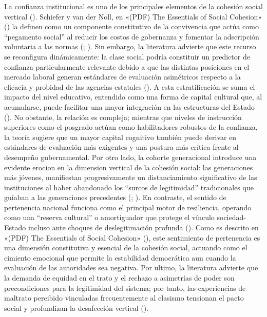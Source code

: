 \documentclass[
  spanish,
  a4paper,
  oneside]{scrbook}
\begin{document}
La confianza institucional es uno de los principales elementos de la
cohesión social vertical (). Schiefer y van der Noll, en {«({PDF}) {The Essentials} of
{Social Cohesion}»} () la definen
como un componente constitutivo de la convivencia que actúa como
``pegamento social'' al reducir los costos de gobernanza y fomentar la
adscripción voluntaria a las normas (;
). Sin embargo, la literatura
advierte que este recurso se reconfigura dinámicamente: la clase social
podría constituir un predictor de confianza particularmente relevante
debido a que las distintas posiciones en el mercado laboral generan
estándares de evaluación asimétricos respecto a la eficacia y probidad
de las agencias estatales (). A esta estratificación se suma el impacto del nivel
educativo, entendido como una forma de capital cultural que, al
acumularse, puede facilitar una mayor integración en las estructuras del
Estado (). No obstante,
la relación es compleja; mientras que niveles de instrucción superiores
como el posgrado actúan como habilitadores robustos de la confianza, la
teoría sugiere que un mayor capital cognitivo también puede derivar en
estándares de evaluación más exigentes y una postura más crítica frente
al desempeño gubernamental. Por otro lado, la cohorte generacional
introduce una evidente erocion en la dimension vertical de la cohesión
social: las generaciones más jóvenes, manifiestan progresivamente un
distanciamiento significativo de las instituciones al haber abandonado
los ``surcos de legitimidad'' tradicionales que guiaban a las
generaciones precedentes
(; ). En contraste, el sentido de
pertenencia nacional funciona como el principal motor de resiliencia,
operando como una ``reserva cultural'' o amortiguador que protege el
vínculo sociedad-Estado incluso ante choques de deslegitimación profunda
(). Como es descrito en {«({PDF}) {The
Essentials} of {Social Cohesion}»}
(), este sentimiento de pertenencia
es una dimensión constitutiva y esencial de la cohesión social, actuando
como el cimiento emocional que permite la estabilidad democrática aun
cuando la evaluación de las autoridades sea negativa. Por ultimo, la
literatura advierte que la demanda de equidad en el trato y el rechazo a
asimetrías de poder son precondiciones para la legitimidad del sistema;
por tanto, las experiencias de maltrato percibido vinculadas
frecuentemente al clasismo tensionan el pacto social y profundizan la
desafección vertical ().
\end{document}
